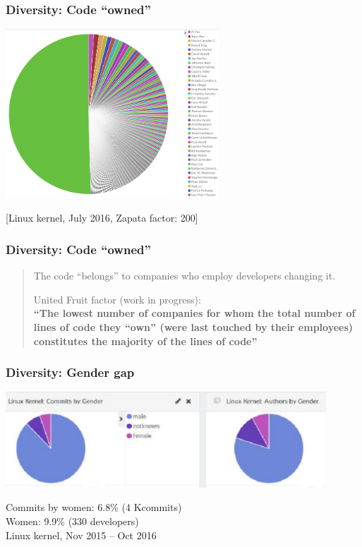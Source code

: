 \documentclass[17pt,aspectratio=169,hyperref=pdfusetitle]{beamer}
\begin{document}
\begin{frame}
\frametitle{Diversity: Code ``owned''}

  \includegraphics[width=8cm]{figs/linux-authors-pie}

  [Linux kernel, July 2016, Zapata factor: 200]
\end{frame}

\begin{frame}
\frametitle{Diversity: Code ``owned''}

{\Large

  \begin{quote}
    The code ``belongs'' to companies who employ developers changing it.

  \vspace{.5cm}
  United Fruit factor (work in progress): \\
  {\bf ``The lowest number of companies for whom the total number of lines of code they ``own'' (were last touched by their employees) constitutes the majority of the lines of code''} \\
  \end{quote}

}
\end{frame}

\begin{frame}
\frametitle{Diversity: Gender gap}

  \includegraphics[width=12cm]{figs/linux-gender}

  \vspace{.4cm}
  
  {\Large
    Commits by women: 6.8\% (4 Kcommits) \\
    Women: 9.9\% (330 developers) \\
    Linux kernel, Nov 2015 -- Oct 2016 \\
}

\end{frame}
\end{document}

